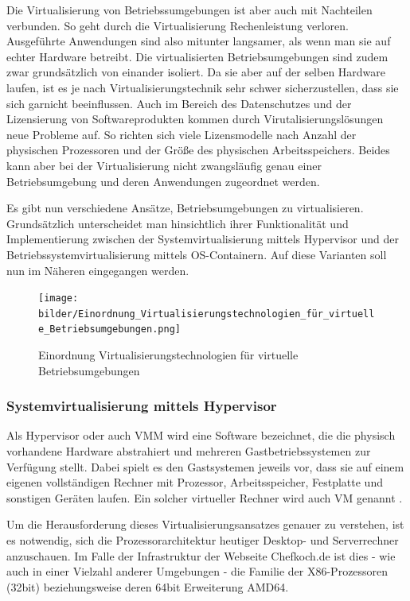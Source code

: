 Die Virtualisierung von Betriebssumgebungen ist aber auch mit Nachteilen verbunden. So geht durch die Virtualisierung Rechenleistung verloren. Ausgeführte Anwendungen sind also mitunter langsamer, als wenn man sie auf echter Hardware betreibt. Die virtualisierten Betriebsumgebungen sind zudem zwar grundsätzlich von einander isoliert. Da sie aber auf der selben Hardware laufen, ist es je nach Virtualisierungstechnik sehr schwer sicherzustellen, dass sie sich garnicht beeinflussen. Auch im Bereich des Datenschutzes und der Lizensierung von Softwareprodukten kommen durch Virutalisierungslösungen neue Probleme auf. So richten sich viele Lizensmodelle nach Anzahl der physischen Prozessoren und der Größe des physischen Arbeitsspeichers. Beides kann aber bei der Virtualisierung nicht zwangsläufig genau einer Betriebsumgebung und deren Anwendungen zugeordnet werden.

Es gibt nun verschiedene Ansätze, Betriebsumgebungen zu virtualisieren. Grundsätzlich unterscheidet man hinsichtlich ihrer Funktionalität und Implementierung zwischen der Systemvirtualisierung mittels Hypervisor und der Betriebssystemvirtualisierung mittels OS-Containern. Auf diese Varianten soll nun im Näheren eingegangen werden.

\begin{figure}[!ht]
  \begin{center}
    \texttt{[image: bilder/Einordnung\_Virtualisierungstechnologien\_für\_virtuelle\_Betriebsumgebungen.png]}
    \caption{Einordnung Virtualisierungstechnologien für virtuelle Betriebsumgebungen \citep{Hirschbach06}}
  \end{center}
\end{figure}

\subsubsection{Systemvirtualisierung mittels Hypervisor}

Als Hypervisor oder auch \ac{VMM} wird eine Software bezeichnet, die die physisch vorhandene Hardware abstrahiert und mehreren Gastbetriebssystemen zur Verfügung stellt. Dabei spielt es den Gastsystemen jeweils vor, dass sie auf einem eigenen vollständigen Rechner mit Prozessor, Arbeitsspeicher, Festplatte und sonstigen Geräten laufen. Ein solcher virtueller Rechner wird auch \ac{VM} genannt \citep[Vgl.][S. 413]{PopGol74}.

Um die Herausforderung dieses Virtualisierungsansatzes genauer zu verstehen, ist es notwendig, sich die Prozessorarchitektur heutiger Desktop- und Serverrechner anzuschauen. Im Falle der Infrastruktur der Webseite Chefkoch.de ist dies - wie auch in einer Vielzahl anderer Umgebungen - die Familie der X86-Prozessoren (32bit) beziehungsweise deren 64bit Erweiterung AMD64.

